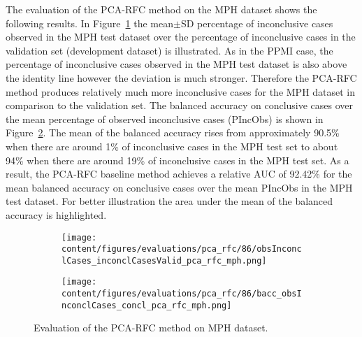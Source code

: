 

The evaluation of the PCA-RFC method on the MPH dataset shows the following results.
In Figure~\ref{fig:obsInconclCases_inconclCasesValid_pca_rfc_mph} 
the mean$\pm$SD percentage of inconclusive cases observed in the MPH test dataset 
over the percentage of inconclusive cases in the validation set (development dataset) is illustrated.
As in the PPMI case, the percentage of inconclusive cases observed in the MPH test dataset
is also above the identity line however the deviation is much stronger.
Therefore the PCA-RFC method produces relatively much more inconclusive cases for the MPH dataset  
in comparison to the validation set.
The balanced accuracy on conclusive cases over the mean percentage of observed inconclusive cases (PIncObs) is shown 
in Figure~\ref{fig:bacc_obsInconclCases_concl_pca_rfc_mph}.
The mean of the balanced accuracy rises from approximately 90.5\% 
when there are around 1\% of inconclusive cases in the MPH test set to about 94\% 
when there are around 19\% of inconclusive cases in the MPH test set.
As a result, the PCA-RFC baseline method achieves a relative AUC of 92.42\% for the mean balanced accuracy on conclusive cases 
over the mean PIncObs in the MPH test dataset.
For better illustration the area under the mean of the balanced accuracy is highlighted.


\begin{figure}[ht]
  \begin{subfigure}{0.9\textwidth}
    \centering
    \texttt{[image: content/figures/evaluations/pca\_rfc/86/obsInconclCases\_inconclCasesValid\_pca\_rfc\_mph.png]}
    \label{fig:obsInconclCases_inconclCasesValid_pca_rfc_mph}
  \end{subfigure}
  \hfill
  \begin{subfigure}{0.9\textwidth}
    \centering
    \texttt{[image: content/figures/evaluations/pca\_rfc/86/bacc\_obsInconclCases\_concl\_pca\_rfc\_mph.png]}
    \label{fig:bacc_obsInconclCases_concl_pca_rfc_mph}
  \end{subfigure}
  \caption{Evaluation of the PCA-RFC method on MPH dataset.}
  \label{fig:perf_results_rfc_mph}
\end{figure}



